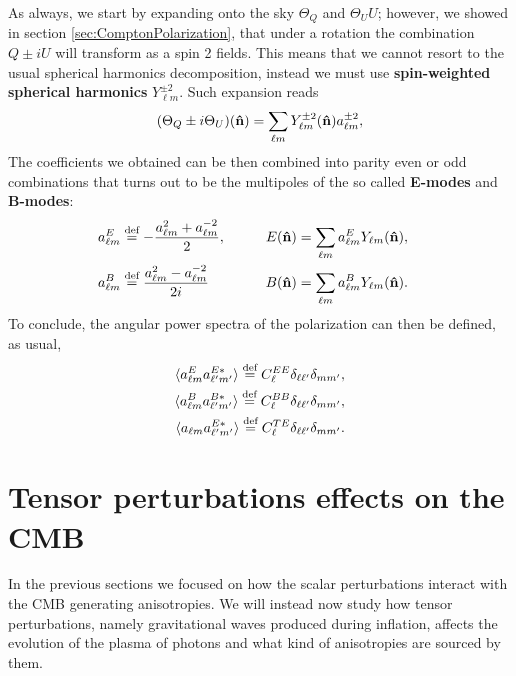 As always, we start by expanding onto the sky $\Theta_Q$ and $\Theta_UU$; however, we showed in section \ref{sec:ComptonPolarization}, that under a rotation the combination $Q\pm iU$ will transform as a spin 2 fields. This means that we cannot resort to the usual spherical harmonics decomposition, instead we must use \textbf{spin-weighted spherical harmonics} $Y_{\ell m}^{\pm2}$. Such expansion reads
\begin{equation}
    (\Theta_Q\pm i\Theta_U)(\mathbf{\hat{n}})=\sum_{\ell m} Y^{\pm2}_{\ell m}(\mathbf{\hat{n}})a^{\pm2}_{\ell m} ,\label{eq:EB_sky_expansion}
\end{equation}
The coefficients we obtained can be then combined into parity even or odd combinations that turns out to be the multipoles of the so called \textbf{E-modes} and \textbf{B-modes}:
\begin{align*}
    a^E_{\ell m}&\stackrel{\text{def}}{=}-\frac{a^2_{\ell m}+a^{-2}_{\ell m}}{2},\qquad &E(\mathbf{\hat{n}})=\sum_{\ell m}a^E_{\ell m}Y_{\ell m}(\mathbf{\hat{n}}),&&\\ a^B_{\ell m}&\stackrel{\text{def}}{=}\frac{a^2_{\ell m}-a^{-2}_{\ell m}}{2i}
    \qquad &B(\mathbf{\hat{n}})=\sum_{\ell m}a^B_{\ell m}Y_{\ell m}(\mathbf{\hat{n}}).&&
\end{align*}
To conclude, the angular power spectra of the polarization can then be defined, as usual,
\begin{subequations}
    \label{eq:PolPowerSpectrum}
\begin{align}
    \langle a^E_{\ell m}a^{E*}_{\ell' m'}\rangle\stackrel{\text{def}}{=} C_{\ell}^{EE}\delta_{\ell \ell'}\delta_{m m'},\\ \langle a^B_{\ell m}a^{B*}_{\ell' m'}\rangle\stackrel{\text{def}}{=} C_{\ell}^{BB}\delta_{\ell \ell'}\delta_{m m'},\\\langle a_{\ell m}a^{E*}_{\ell' m'}\rangle\stackrel{\text{def}}{=} C_{\ell}^{TE}\delta_{\ell \ell'}\delta_{m m'}.
\end{align}
\end{subequations}
\section{Tensor perturbations effects on the CMB}\label{sec:Anisotropies_From_Tensor}
In the previous sections we focused on how the scalar perturbations interact with the CMB generating anisotropies. We will instead now study how tensor perturbations, namely gravitational waves produced during inflation, affects the evolution of the plasma of photons and what kind of anisotropies are sourced by them.

